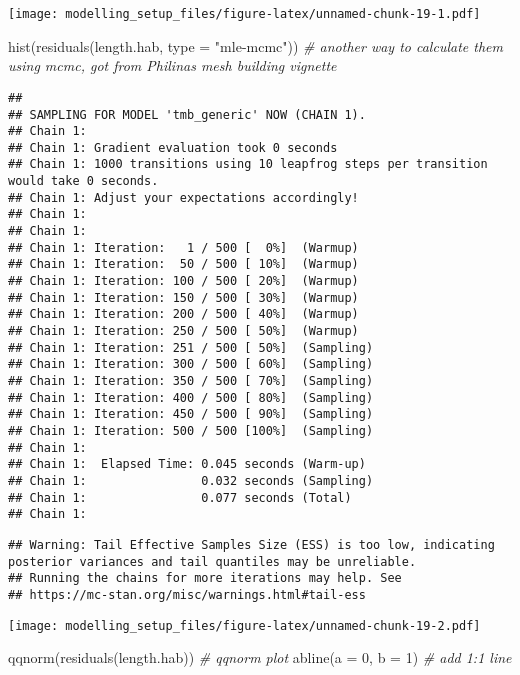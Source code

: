 \documentclass[
]{article}
\newenvironment{Shaded}{\begin{snugshade}}{\end{snugshade}}
\newcommand{\AttributeTok}[1]{\textcolor[rgb]{0.77,0.63,0.00}{#1}}
\newcommand{\CommentTok}[1]{\textcolor[rgb]{0.56,0.35,0.01}{\textit{#1}}}
\newcommand{\DecValTok}[1]{\textcolor[rgb]{0.00,0.00,0.81}{#1}}
\newcommand{\FunctionTok}[1]{\textcolor[rgb]{0.00,0.00,0.00}{#1}}
\newcommand{\NormalTok}[1]{#1}
\newcommand{\StringTok}[1]{\textcolor[rgb]{0.31,0.60,0.02}{#1}}
\begin{document}
\texttt{[image: modelling\_setup\_files/figure-latex/unnamed-chunk-19-1.pdf]}

\begin{Shaded}
\begin{Highlighting}[]
\FunctionTok{hist}\NormalTok{(}\FunctionTok{residuals}\NormalTok{(length.hab, }\AttributeTok{type =} \StringTok{"mle{-}mcmc"}\NormalTok{)) }\CommentTok{\# another way to calculate them using mcmc, got from Philina\textquotesingle{}s mesh building vignette}
\end{Highlighting}
\end{Shaded}

\begin{verbatim}
## 
## SAMPLING FOR MODEL 'tmb_generic' NOW (CHAIN 1).
## Chain 1: 
## Chain 1: Gradient evaluation took 0 seconds
## Chain 1: 1000 transitions using 10 leapfrog steps per transition would take 0 seconds.
## Chain 1: Adjust your expectations accordingly!
## Chain 1: 
## Chain 1: 
## Chain 1: Iteration:   1 / 500 [  0%]  (Warmup)
## Chain 1: Iteration:  50 / 500 [ 10%]  (Warmup)
## Chain 1: Iteration: 100 / 500 [ 20%]  (Warmup)
## Chain 1: Iteration: 150 / 500 [ 30%]  (Warmup)
## Chain 1: Iteration: 200 / 500 [ 40%]  (Warmup)
## Chain 1: Iteration: 250 / 500 [ 50%]  (Warmup)
## Chain 1: Iteration: 251 / 500 [ 50%]  (Sampling)
## Chain 1: Iteration: 300 / 500 [ 60%]  (Sampling)
## Chain 1: Iteration: 350 / 500 [ 70%]  (Sampling)
## Chain 1: Iteration: 400 / 500 [ 80%]  (Sampling)
## Chain 1: Iteration: 450 / 500 [ 90%]  (Sampling)
## Chain 1: Iteration: 500 / 500 [100%]  (Sampling)
## Chain 1: 
## Chain 1:  Elapsed Time: 0.045 seconds (Warm-up)
## Chain 1:                0.032 seconds (Sampling)
## Chain 1:                0.077 seconds (Total)
## Chain 1:
\end{verbatim}

\begin{verbatim}
## Warning: Tail Effective Samples Size (ESS) is too low, indicating posterior variances and tail quantiles may be unreliable.
## Running the chains for more iterations may help. See
## https://mc-stan.org/misc/warnings.html#tail-ess
\end{verbatim}

\texttt{[image: modelling\_setup\_files/figure-latex/unnamed-chunk-19-2.pdf]}

\begin{Shaded}
\begin{Highlighting}[]
\FunctionTok{qqnorm}\NormalTok{(}\FunctionTok{residuals}\NormalTok{(length.hab)) }\CommentTok{\# qqnorm plot}
\FunctionTok{abline}\NormalTok{(}\AttributeTok{a =} \DecValTok{0}\NormalTok{, }\AttributeTok{b =} \DecValTok{1}\NormalTok{) }\CommentTok{\# add 1:1 line}
\end{Highlighting}
\end{Shaded}
\end{document}
